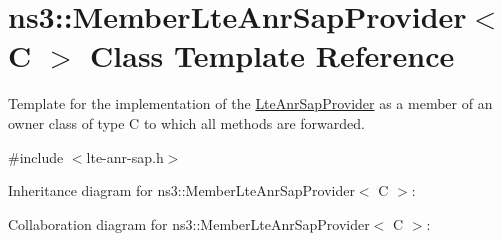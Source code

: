 \hypertarget{classns3_1_1MemberLteAnrSapProvider}{}\section{ns3\+:\+:Member\+Lte\+Anr\+Sap\+Provider$<$ C $>$ Class Template Reference}
\label{classns3_1_1MemberLteAnrSapProvider}


Template for the implementation of the \hyperlink{classns3_1_1LteAnrSapProvider}{Lte\+Anr\+Sap\+Provider} as a member of an owner class of type C to which all methods are forwarded.  




{\ttfamily \#include $<$lte-\/anr-\/sap.\+h$>$}



Inheritance diagram for ns3\+:\+:Member\+Lte\+Anr\+Sap\+Provider$<$ C $>$\+:


Collaboration diagram for ns3\+:\+:Member\+Lte\+Anr\+Sap\+Provider$<$ C $>$\+:
